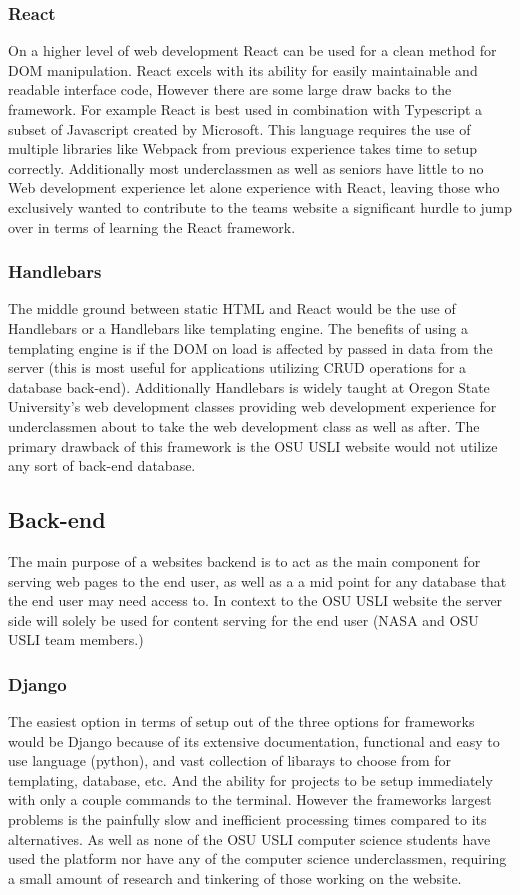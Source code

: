 \documentclass[onecolumn, draftclsnofoot,10pt, compsoc]{IEEEtran}
\begin{document}
\subsubsection{React}
On a higher level of web development React can be used for a clean method for DOM manipulation. React excels with its ability for easily maintainable and readable interface code, However there are some large draw backs to the framework. For example React is best used in combination with Typescript a subset of Javascript created by Microsoft. This language requires the use of multiple libraries like Webpack from previous experience takes time to setup correctly. Additionally most underclassmen as well as seniors have little to no Web development experience let alone experience with React, leaving those who exclusively wanted to contribute to the teams website a significant hurdle to jump over in terms of learning the React framework.
\subsubsection{Handlebars}
The middle ground between static HTML and React would be the use of Handlebars or a Handlebars like templating engine. The benefits of using a templating engine is if the DOM on load is affected by passed in data from the server (this is most useful for applications utilizing CRUD operations for a database back-end). Additionally Handlebars is widely taught at Oregon State University's web development classes providing web development experience for underclassmen about to take the web development class as well as after. The primary drawback of this framework is the OSU USLI website would not utilize any sort of back-end database.

\subsection{Back-end}
The main purpose of a websites backend is to act as the main component for serving web pages to the end user, as well as a a mid point for any database that the end user may need access to. In context to the OSU USLI website the server side will solely be used for content serving for the end user (NASA and OSU USLI team members.)
\subsubsection{Django}
The easiest option in terms of setup out of the three options for frameworks would be Django because of its extensive documentation, functional and easy to use language (python), and vast collection of libarays to choose from for templating, database, etc. And the ability for projects to be setup immediately with only a couple commands to the terminal. However the frameworks largest problems is the painfully slow and inefficient processing times compared to its alternatives. As well as none of the OSU USLI computer science students have used the platform nor have any of the computer science underclassmen, requiring a small amount of research and tinkering of those working on the website. 
\end{document}
